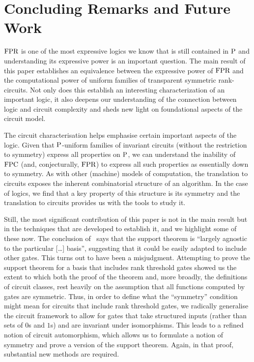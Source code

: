 \documentclass[a4paper,UKenglish]{lipics-v2018}
\begin{document}
\section{Concluding Remarks and Future Work}
$\text{\upshape FPR}$ is one of the most expressive logics we know that is still contained in
$\mathrm{P}$ and understanding its expressive power is an important question. The main
result of this paper establishes an equivalence between the expressive power of
$\text{\upshape FPR}$ and the computational power of uniform families of transparent symmetric
rank-circuits. Not only does this establish an interesting
characterization of an important logic, it also deepens our understanding of
the connection between logic and circuit complexity and sheds new
light on foundational aspects of the circuit model.

The circuit characterisation helps emphasise certain important aspects of
the logic. Given that $\mathrm{P}$-uniform families of invariant circuits (without the
restriction to symmetry) express all properties on $\mathrm{P}$, we can understand the
inability of $\text{\upshape FPC}$ (and, conjecturally, $\text{\upshape FPR}$) to express all such properties
as essentially down to symmetry. As with other (machine) models of computation,
the translation to circuits exposes the inherent combinatorial structure of an
algorithm. In the case of logics, we find that a key property of this structure
is its symmetry and the translation to circuits provides us with the tools to
study it.

Still, the most significant contribution of this paper is not in the main result
but in the techniques that are developed to establish it, and we highlight some
of these now. The conclusion of~\cite{AndersonD17} says that the support theorem
is ``largely agnostic to the particular [\ldots] basis'', suggesting that it
could be easily adapted to include other gates. This turns out to have been a
misjudgment. Attempting to prove the support theorem for a basis that includes
rank threshold gates showed us the extent to which both the proof of the theorem
and, more broadly, the definitions of circuit classes, rest heavily on the
assumption that all functions computed by gates are symmetric. Thus, in order to
define what the ``symmetry'' condition might mean for circuits that include rank
threshold gates, we radically generalise the circuit framework to allow for
gates that take structured inputs (rather than sets of $0$s and $1$s) and are
invariant under isomorphisms. This leads to a refined notion of circuit
automorphism, which allows us to formulate a notion of symmetry and prove a
version of the support theorem. Again, in that proof, substantial new methods
are required.
\end{document}
